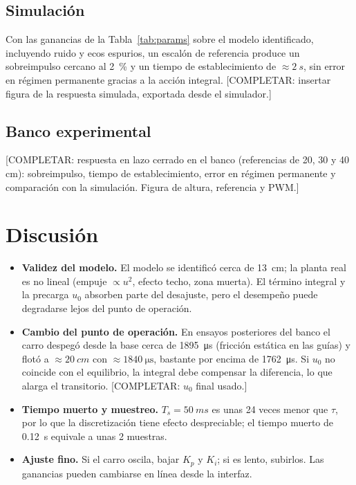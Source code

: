 \documentclass[conference,10pt]{IEEEtran}
\begin{document}
\subsection{Simulación}
Con las ganancias de la Tabla~\ref{tab:params} sobre el modelo identificado, incluyendo ruido y ecos espurios, un escalón de referencia produce un sobreimpulso cercano al \SI{2}{\percent} y un tiempo de establecimiento de $\approx\SI{2}{s}$, sin error en régimen permanente gracias a la acción integral. [COMPLETAR: insertar figura de la respuesta simulada, exportada desde el simulador.]

\subsection{Banco experimental}
[COMPLETAR: respuesta en lazo cerrado en el banco (referencias de 20, 30 y 40 cm): sobreimpulso, tiempo de establecimiento, error en régimen permanente y comparación con la simulación. Figura de altura, referencia y PWM.]

\section{Discusión}
\begin{itemize}
\item \textbf{Validez del modelo.} El modelo se identificó cerca de \SI{13}{cm}; la planta real es no lineal (empuje $\propto u^2$, efecto techo, zona muerta). El término integral y la precarga $u_0$ absorben parte del desajuste, pero el desempeño puede degradarse lejos del punto de operación.
\item \textbf{Cambio del punto de operación.} En ensayos posteriores del banco el carro despegó desde la base cerca de \SI{1895}{\micro\second} (fricción estática en las guías) y flotó a $\approx\SI{20}{cm}$ con $\approx\SI{1840}{\micro\second}$, bastante por encima de \SI{1762}{\micro\second}. Si $u_0$ no coincide con el equilibrio, la integral debe compensar la diferencia, lo que alarga el transitorio. [COMPLETAR: $u_0$ final usado.]
\item \textbf{Tiempo muerto y muestreo.} $T_s=\SI{50}{ms}$ es unas 24 veces menor que $\tau$, por lo que la discretización tiene efecto despreciable; el tiempo muerto de \SI{0.12}{s} equivale a unas 2 muestras.
\item \textbf{Ajuste fino.} Si el carro oscila, bajar $K_p$ y $K_i$; si es lento, subirlos. Las ganancias pueden cambiarse en línea desde la interfaz.
\end{itemize}
\end{document}
